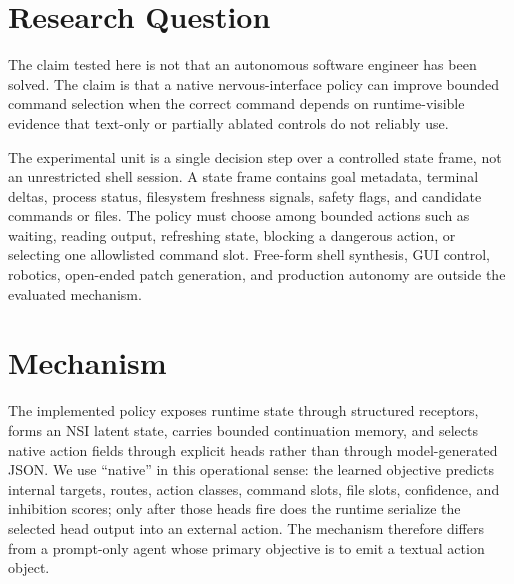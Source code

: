 \documentclass[11pt]{article}
\begin{document}
\section{Research Question}

The claim tested here is not that an autonomous software engineer has been
solved. The claim is that a native nervous-interface policy can improve bounded
command selection when the correct command depends on runtime-visible evidence
that text-only or partially ablated controls do not reliably use.

The experimental unit is a single decision step over a controlled state frame,
not an unrestricted shell session. A state frame contains goal metadata,
terminal deltas, process status, filesystem freshness signals, safety flags,
and candidate commands or files. The policy must choose among bounded actions
such as waiting, reading output, refreshing state, blocking a dangerous action,
or selecting one allowlisted command slot. Free-form shell synthesis, GUI
control, robotics, open-ended patch generation, and production autonomy are
outside the evaluated mechanism.

\section{Mechanism}

The implemented policy exposes runtime state through structured receptors,
forms an NSI latent state, carries bounded continuation memory, and selects
native action fields through explicit heads rather than through model-generated
JSON. We use ``native'' in this operational sense: the learned objective predicts
internal targets, routes, action classes, command slots, file slots, confidence,
and inhibition scores; only after those heads fire does the runtime serialize the
selected head output into an external action. The mechanism therefore differs
from a prompt-only agent whose primary objective is to emit a textual action
object.
\end{document}
